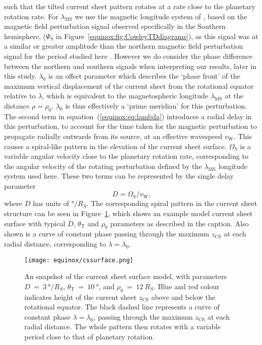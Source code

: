such that the tilted current sheet pattern rotates at a rate close to the planetary rotation rate. For $\lambda_\mathrm{MS}$ we use the magnetic longitude system of \citet{andrews2012}, based on the magnetic field perturbation signal observed specifically in the Southern hemisphere, ($\Psi_\mathrm{S}$ in Figure~\ref{equinox:fig:CowleyTDdiagrams}), as this signal was at a similar or greater amplitude than the northern magnetic field perturbation signal for the period studied here \citep{andrews2012}. However we do consider the phase difference between the northern and southern signals when interpreting our results, later in this study. $\lambda_0$ is an offset parameter which describes the `phase front' of the maximum vertical displacement of the current sheet from the rotational equator relative to $\lambda$, which is equivalent to the magnetospheric longitude $\lambda_\mathrm{MS}$ at the distance $\rho = \rho_0$. $\lambda_0$ is thus effectively a `prime meridian' for this perturbation. The second term in equation~(\ref{equinox:eq:lambda}) introduces a radial delay in this perturbation, to account for the time taken for the magnetic perturbation to propagate radially outwards from its source, at an effective wavespeed $v_\mathrm{W}$. This causes a spiral-like pattern in the elevation of the current sheet surface. $\Omega_\mathrm{S}$ is a variable angular velocity close to the planetary rotation rate, corresponding to the angular velocity of the rotating perturbation defined by the $\lambda_\mathrm{MS}$ longitude system used here. These two terms can be represented by the single delay parameter
\begin{equation}\label{equinox:eq:D}
D = \Omega_\mathrm{S}/v_\mathrm{W},
\end{equation}
where $D$ has units of $\si{\degree\per R_S}$. The corresponding spiral pattern in the current sheet structure can be seen in Figure~\ref{equinox:fig:cssurfacemodel}, which shows an example model current sheet surface with typical $D$, $\theta_\mathrm{T}$ and $\rho_0$ parameters as described in the caption. Also shown is a curve of constant phase passing through the maximum $z_\mathrm{CS}$ at each radial distance, corresponding to $\lambda=\lambda_0$.
\begin{figure}
\centering
\texttt{[image: equinox/cssurface.png]}
\caption[Snapshot of tilted, rippled current sheet surface model.]{An snapshot of the current sheet surface model, with parameters $D~{=}~\SI{3}{\degree/R_S}$, $\theta_\mathrm{T}~{=}~\SI{10}{\degree}$, and $\rho_0~{=}~\SI{12}{R_S}$. Blue and red colour indicates height of the current sheet $z_\mathrm{CS}$ above and below the rotational equator. The black dashed line represents a curve of constant phase $\lambda = \lambda_0$, passing through the maximum $z_\mathrm{CS}$ at each radial distance. The whole pattern then rotates with a variable period close to that of planetary rotation.}
\label{equinox:fig:cssurfacemodel}
\end{figure}

